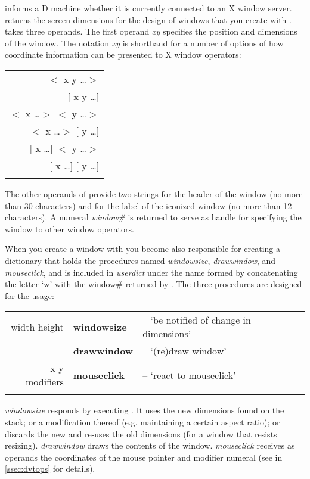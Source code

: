  informs a D machine whether it is currently connected
to an X window server.  returns the screen dimensions
for the design of windows that you create with
.  takes three operands. The first
operand \emph{xy} specifies the position and dimensions of the
window. The notation \emph{xy} is shorthand for a number of options of
how coordinate information can be presented to X window operators:\\

\begin{tabular}{>{\sffamily}r} 
$<$ x y \ldots $>$\\{}
$[$ x y \ldots $]$\\{}
$<$ x \ldots $>$ $<$ y \ldots $>$ \\{}
$<$ x \ldots $>$ $[$ y \ldots $]$\\{}
$[$ x \ldots $]$ $<$ y \ldots $>$\\{}
$[$ x \ldots $]$ $[$ y \ldots $]$\\{}
\end{tabular}

The other operands of  provide two strings for the
header of the window (no more than 30 characters) and for the label of
the iconized window (no more than 12 characters). A numeral
\emph{window\#} is returned to serve as handle for specifying the
window to other window operators.

When you create a window with  you become also
responsible for creating a dictionary that holds the procedures named
\emph{windowsize}, \emph{drawwindow}, and \emph{mouseclick}, and is
included in \emph{userdict} under the name formed by concatenating the
letter `w' with the window\# returned by . The three
procedures are designed for the usage:\\

\begin{tabular}{>{\sffamily}r>{\sffamily\bfseries}l>{\sffamily}l}
width height & windowsize & -- `be notified of change in dimensions'\\
-- & drawwindow & -- `(re)draw window'\\
x y modifiers & mouseclick & -- `react to mouseclick'\\\\
\end{tabular}

\emph{windowsize} responds by executing . It uses
the new dimensions found on the stack; or a modification thereof
(e.g. maintaining a certain aspect ratio); or discards the new and
re-uses the old dimensions (for a window that resists
resizing). \emph{drawwindow} draws the contents of the
window. \emph{mouseclick} receives as operands the coordinates of the
mouse pointer and modifier numeral (see  in
\ref{ssec:dvtops} for details).

